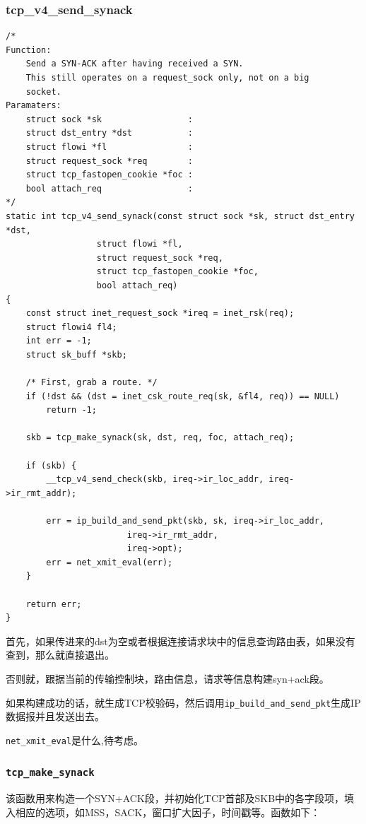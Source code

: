             \subsubsection{tcp\_v4\_send\_synack}
\begin{verbatim}
/*
Function: 
    Send a SYN-ACK after having received a SYN.
    This still operates on a request_sock only, not on a big
    socket.
Paramaters:
    struct sock *sk                 :
    struct dst_entry *dst           :
    struct flowi *fl                :
    struct request_sock *req        :
    struct tcp_fastopen_cookie *foc :
    bool attach_req                 :
*/
static int tcp_v4_send_synack(const struct sock *sk, struct dst_entry *dst,
                  struct flowi *fl,
                  struct request_sock *req,
                  struct tcp_fastopen_cookie *foc,
                  bool attach_req)
{
    const struct inet_request_sock *ireq = inet_rsk(req);
    struct flowi4 fl4;
    int err = -1;
    struct sk_buff *skb;

    /* First, grab a route. */
    if (!dst && (dst = inet_csk_route_req(sk, &fl4, req)) == NULL)
        return -1;

    skb = tcp_make_synack(sk, dst, req, foc, attach_req);

    if (skb) {
        __tcp_v4_send_check(skb, ireq->ir_loc_addr, ireq->ir_rmt_addr);

        err = ip_build_and_send_pkt(skb, sk, ireq->ir_loc_addr,
                        ireq->ir_rmt_addr,
                        ireq->opt);
        err = net_xmit_eval(err);
    }

    return err;
}
\end{verbatim}                
                首先，如果传进来的dst为空或者根据连接请求块中的信息查询路由表，如果没有查到，那么就直接退出。

                否则就，跟据当前的传输控制块，路由信息，请求等信息构建syn+ack段。

                如果构建成功的话，就生成TCP校验码，然后调用\texttt{ip_build_and_send_pkt}生成IP数据报并且发送出去。

                \texttt{net_xmit_eval}是什么,待考虑。


            \subsubsection{\texttt{tcp_make_synack}}

                该函数用来构造一个SYN+ACK段，并初始化TCP首部及SKB中的各字段项，填入相应的选项，如MSS，SACK，窗口扩大因子，时间戳等。函数如下：

